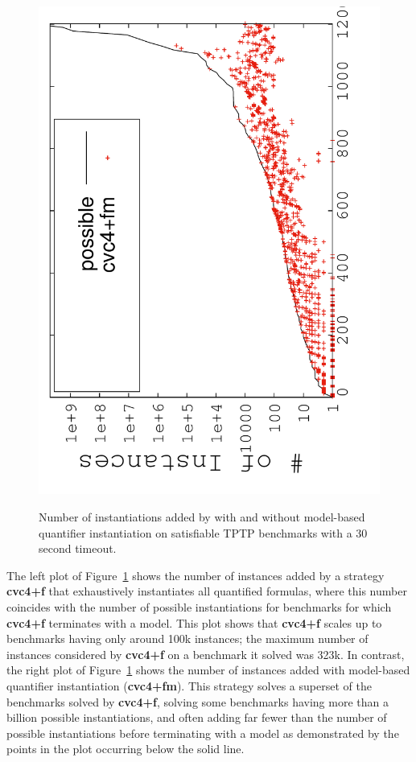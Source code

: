 \documentclass[oribibl]{llncs}
\begin{document}
\begin{figure}[t]
{\includegraphics[scale=.22, angle=270]{model-size-mbqi.pdf} 
}%
\caption{
Number of instantiations added by \cvc with and without model-based quantifier instantiation
on satisfiable TPTP benchmarks with a 30 second timeout.
}
\label{fig:inst-mbqi}
\end{figure}

The left plot of Figure~\ref{fig:inst-mbqi} shows the number of instances
added by a strategy {\bf cvc4+f} that exhaustively instantiates all quantified formulas,
where this number coincides with the number of possible instantiations for benchmarks for which
{\bf cvc4+f} terminates with a model.
This plot shows that {\bf cvc4+f} scales up to benchmarks having only around 100k instances;
the maximum number of instances considered by {\bf cvc4+f} on a benchmark it solved was 323k.
In contrast, the right plot of Figure~\ref{fig:inst-mbqi} shows the number of instances
added with model-based quantifier instantiation ({\bf cvc4+fm}).
This strategy solves a superset of the benchmarks solved by {\bf cvc4+f},
solving some benchmarks having more than a billion possible instantiations,
and often adding far fewer than the number of possible instantiations before terminating with a model
as demonstrated by the points in the plot occurring below the solid line.
\end{document}
